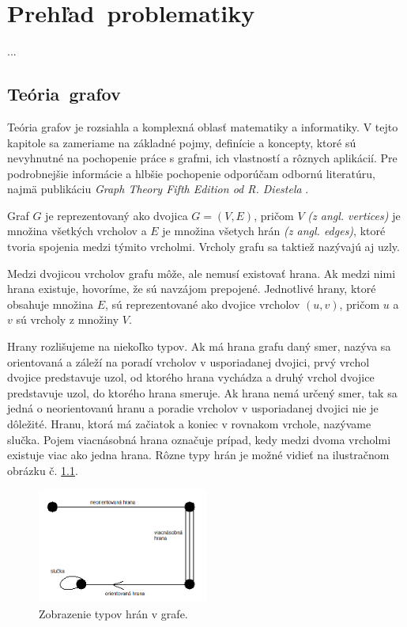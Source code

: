 \chapter{Prehľad~problematiky}\label{ch:terminology}

...

\section{Teória~grafov}\label{sec:graph-theory}

Teória grafov je rozsiahla a komplexná oblasť matematiky a informatiky. V tejto kapitole sa zameriame na základné 
pojmy, definície a koncepty, ktoré sú nevyhnutné na pochopenie práce s grafmi, ich vlastností a rôznych aplikácií. 
Pre podrobnejšie informácie a hlbšie pochopenie odporúčam odbornú literatúru, najmä publikáciu
\textit{Graph Theory Fifth Edition od R. Diestela} \cite{diestel2017graph}.

Graf $G$ je reprezentovaný ako dvojica $G = (V, E)$, pričom $V$ \textit{(z angl. vertices)} je množina všetkých
vrcholov a $E$ je množina všetych hrán \textit{(z angl. edges)}, ktoré tvoria spojenia medzi týmito vrcholmi.
Vrcholy grafu sa taktiež nazývajú aj uzly.

Medzi dvojicou vrcholov grafu môže, ale nemusí existovať hrana. Ak medzi nimi hrana existuje, hovoríme, že sú
navzájom prepojené. Jednotlivé hrany, ktoré obsahuje množina $E$, sú reprezentované ako dvojice vrcholov $(u, v)$, 
pričom $u$ a $v$ sú vrcholy z množiny $V$. 

Hrany rozlišujeme na niekoľko typov. Ak má hrana grafu daný smer, nazýva sa orientovaná a záleží
na poradí vrcholov v usporiadanej dvojici, prvý vrchol dvojice predstavuje uzol, od ktorého hrana vychádza a 
druhý vrchol dvojice predstavuje uzol, do ktorého hrana smeruje. Ak hrana nemá určený smer, tak sa jedná o 
neorientovanú hranu a poradie vrcholov v usporiadanej dvojici nie je dôležité. Hranu, ktorá má začiatok a koniec 
v rovnakom vrchole, nazývame slučka. Pojem viacnásobná hrana označuje prípad, kedy medzi dvoma vrcholmi existuje viac ako jedna hrana. 
Rôzne typy hrán je možné vidieť na ilustračnom obrázku č. \ref{obr:edges}.

\begin{figure}
    \centerline{\includegraphics[width=0.5\textwidth]{images/edges.png}}
    \caption[Zobrazenie typov hrán v grafe.]{Zobrazenie typov hrán v grafe.}
    \label{obr:edges}
\end{figure}

